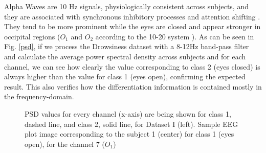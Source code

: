    
Alpha Waves are 10 Hz signals, physiologically consistent across subjects, and they are associated with synchronous inhibitory processes and attention shifting \cite{c3}. They tend to be more prominent while the eyes are closed and appear stronger in occipital regions ($O_1$ and $O_2$ according to the 10-20 system \cite{c6,c11}). As can be seen in Fig. \ref{psd}, if we process the Drowsiness dataset with a 8-12Hz band-pass filter and calculate the average power spectral density across subjects and for each channel, we can see how clearly the value corresponding to class 2 (eyes closed) is always higher than the value for class 1 (eyes open), confirming the expected result.  This also verifies how the differentiation information is contained mostly in the frequency-domain.

   \begin{figure}[thpb]
      \centering
      \setlength\fboxsep{0pt}
	  \setlength\fboxrule{0.5pt}
      \caption{PSD values for every channel (x-axis) are being shown for class 1, dashed line, and class 2, solid line, for Dataset I (left). Sample EEG plot image corresponding to the subject 1 (center) for class 1 (eyes open), for the channel 7 ($ O_1 $) }
      \label{figure1}
   \end{figure}
   
